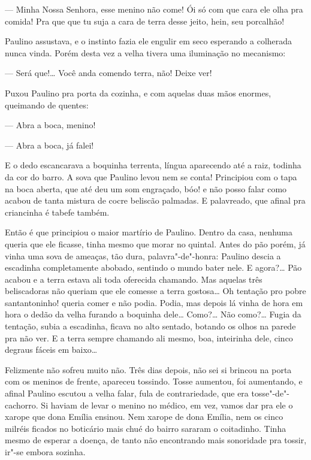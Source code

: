 --- Minha Nossa Senhora, esse menino não come! Ói só com que cara ele
olha pra comida! Pra que que tu suja a cara de terra desse jeito, hein,
seu porcalhão!

Paulino assustava, e o instinto fazia ele engulir em seco esperando a
colherada nunca vinda. Porém desta vez a velha tivera uma iluminação no
mecanismo:

--- Será que!\ldots{} Você anda comendo terra, não! Deixe ver!

Puxou Paulino pra porta da cozinha, e com aquelas duas mãos enormes,
queimando de quentes:

--- Abra a boca, menino!


--- Abra a boca, já falei!

E o dedo escancarava a boquinha terrenta, língua aparecendo até a raiz,
todinha da cor do barro. A sova que Paulino levou nem se conta!
Principiou com o tapa na boca aberta, que até deu um som engraçado, bóo!
e não posso falar como acabou de tanta mistura de cocre beliscão
palmadas. E palavreado, que afinal pra criancinha é tabefe também.

Então é que principiou o maior martírio de Paulino. Dentro da casa,
nenhuma queria que ele ficasse, tinha mesmo que morar no quintal. Antes
do pão porém, já vinha uma sova de ameaças, tão dura, palavra"-de"-honra:
Paulino descia a escadinha completamente abobado, sentindo o mundo bater
nele. E agora?\ldots{} Pão acabou e a terra estava ali toda oferecida
chamando. Mas aquelas três beliscadoras não queriam que ele comesse a
terra gostosa\ldots{} Oh tentação pro pobre santantoninho! queria comer e não
podia. Podia, mas depois lá vinha de hora em hora o dedão da velha
furando a boquinha dele\ldots{} Como?\ldots{} Não como?\ldots{} Fugia da tentação,
subia a escadinha, ficava no alto sentado, botando os olhos na parede
pra não ver. E a terra sempre chamando ali mesmo, boa, inteirinha dele,
cinco degraus fáceis em baixo\ldots{}

Felizmente não sofreu muito não. Três dias depois, não sei si brincou na
porta com os meninos de frente, apareceu tossindo. Tosse aumentou, foi
aumentando, e afinal Paulino escutou a velha falar, fula de
contrariedade, que era tosse"-de"-cachorro. Si haviam de levar o menino no
médico, em vez, vamos dar pra ele o xarope que dona Emília ensinou. Nem
xarope de dona Emília, nem os cinco milréis ficados no boticário mais
chué do bairro sararam o coitadinho. Tinha mesmo de esperar a doença, de
tanto não encontrando mais sonoridade pra tossir, ir"-se embora sozinha.

